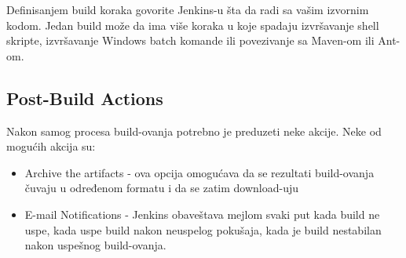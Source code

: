 Definisanjem build koraka govorite Jenkins-u šta da radi sa vašim izvornim kodom. Jedan build može da ima više koraka u koje spadaju izvršavanje shell skripte, izvršavanje Windows batch komande ili povezivanje sa Maven-om ili Ant-om.

\subsection{Post-Build Actions}

Nakon samog procesa build-ovanja potrebno je preduzeti neke akcije. Neke od mogućih akcija su:
\begin{itemize}
\item Archive the artifacts - ova opcija omogućava da se rezultati build-ovanja čuvaju u određenom formatu i da se zatim download-uju
\item E-mail Notifications - Jenkins obaveštava mejlom svaki put kada build ne uspe, kada uspe build nakon neuspelog pokušaja, kada je build nestabilan nakon uspešnog build-ovanja.
\end{itemize}